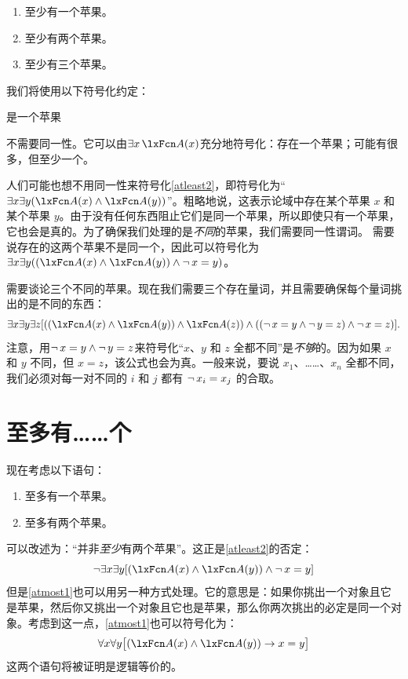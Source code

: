 \begin{enumerate}
\item\label{atleast1} 至少有一个苹果。
\item\label{atleast2} 至少有两个苹果。
\item\label{atleast3} 至少有三个苹果。
\end{enumerate}

我们将使用以下符号化约定：

\begin{ekey}
		\item[\atom{A}{x}]  是一个苹果
	\end{ekey}


不需要同一性。它可以由$\exists x\, \atom{A}{x}$充分地符号化：存在一个苹果；可能有很多，但至少一个。

人们可能也想不用同一性来符号化\cref*{atleast2}，即符号化为“$\exists x \exists y(\atom{A}{x} \eand
\atom{A}{y})$”。粗略地说，这表示论域中存在某个苹果 $x$ 和某个苹果 $y$。由于没有任何东西阻止它们是同一个苹果，所以即使只有一个苹果，它也会是真的。为了确保我们处理的是\emph{不同}的苹果，我们需要同一性谓词。
需要说存在的这两个苹果不是同一个，因此可以符号化为$\exists x \exists
y((\atom{A}{x} \eand \atom{A}{y}) \eand \enot\, {x = y})$。

需要谈论三个不同的苹果。现在我们需要三个存在量词，并且需要确保每个量词挑出的是不同的东西：
\[
	\exists x \exists y\exists z[((\atom{A}{x} \eand \atom{A}{y}) \eand \atom{A}{z}) \eand ((\enot\, {x = y} \eand \enot\, {y = z}) \eand \enot\, {x = z})].
\]
注意，用$\neg\, {x = y} \wedge \neg\, {y = z}$来符号化“$x$、$y$ 和 $z$ 全都不同”是\emph{不够}的。因为如果 $x$ 和 $y$ 不同，但 $x = z$，该公式也会为真。一般来说，要说 $x_1$、……、$x_n$ 全都不同，我们必须对每一对不同的 $i$ 和 $j$ 都有 $\neg\, {x_i = x_j}$ 的合取。

\section{至多有……个}
现在考虑以下语句：


\begin{enumerate}
	\item\label{atmost1} 至多有一个苹果。
	\item\label{atmost2} 至多有两个苹果。
\end{enumerate}


可以改述为：“并非\emph{至少}有两个苹果”。这正是\cref{atleast2}的否定：
\[
	\enot \exists x \exists y[(\atom{A}{x} \eand \atom{A}{y}) \eand \enot\, {x = y}]
\]
但是\cref*{atmost1}也可以用另一种方式处理。它的意思是：如果你挑出一个对象且它是苹果，然后你又挑出一个对象且它也是苹果，那么你两次挑出的必定是同一个对象。考虑到这一点，\cref*{atmost1}也可以符号化为：
\[
	\forall x\forall y\bigl[(\atom{A}{x} \eand \atom{A}{y}) \eif x=y\bigr]
\]
这两个语句将被证明是逻辑等价的。

